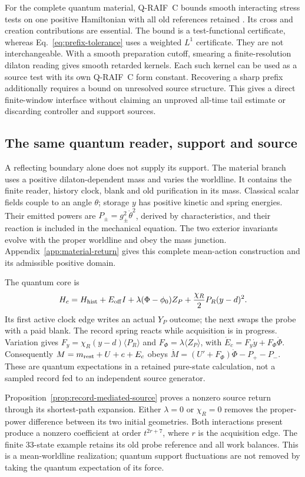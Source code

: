 For the complete quantum material, Q-RAIF~C bounds smooth interacting
stress tests on one positive Hamiltonian with all old references retained
\cite{QRC}. Its cross and creation contributions are essential.
The bound is a test-functional certificate, whereas
Eq.~\eqref{eq:prefix-tolerance} uses a weighted $L^1$ certificate.
They are not interchangeable. With a smooth preparation cutoff,
smearing a finite-resolution dilaton reading gives smooth retarded kernels.
Each such kernel can be used as a source test with its own Q-RAIF~C
form constant. Recovering a sharp prefix additionally requires a bound
on unresolved source structure. This gives a direct finite-window
interface without claiming an unproved all-time tail estimate or
discarding controller and support sources.

\subsection{The same quantum reader, support and source}

A reflecting boundary alone does not supply its support. The material
branch uses a positive dilaton-dependent mass and varies the worldline.
It contains the finite reader, history clock, blank and old purification
in its mass. Classical scalar fields couple to an angle $\theta$; storage
$y$ has positive kinetic and spring energies. Their emitted powers are
$P_\pm=g_\pm^2\dot\theta^2$, derived by characteristics, and their
reaction is included in the mechanical equation. The two exterior
invariants evolve with the proper worldline and obey the mass junction.
Appendix~\ref{app:material-return} gives this complete mean-action
construction and its admissible positive domain.

The quantum core is
\[
 H_c=H_{\rm hist}+E_{\rm off}I+
 \lambda(\Phi-\phi_0)Z_P+
 \frac{\chi_R}{2}P_R(y-d)^2.
\]
Its first active clock edge writes an actual $Y_P$ outcome; the next
swaps the probe with a paid blank. The record spring reacts while
acquisition is in progress. Variation gives
$F_y=\chi_R(y-d)\langle P_R\rangle$ and
$F_\Phi=\lambda\langle Z_P\rangle$, with
$\dot E_c=F_y\dot y+F_\Phi\dot\Phi$.
Consequently $M=m_{\rm rest}+U+e+E_c$ obeys
$\dot M=(U'+F_\Phi)\dot\Phi-P_+-P_-$.
These are quantum expectations in a retained pure-state calculation,
not a sampled record fed to an independent source generator.

Proposition~\ref{prop:record-mediated-source} proves a nonzero source
return through its shortest-path expansion. Either $\lambda=0$ or
$\chi_R=0$ removes the proper-power difference between its two initial
geometries. Both interactions present produce a nonzero coefficient at
order $t^{2r+7}$, where $r$ is the acquisition edge. The finite
33-state example retains its old probe reference and all work balances.
This is a mean-worldline realization; quantum support fluctuations
are not removed by taking the quantum expectation of its force.

